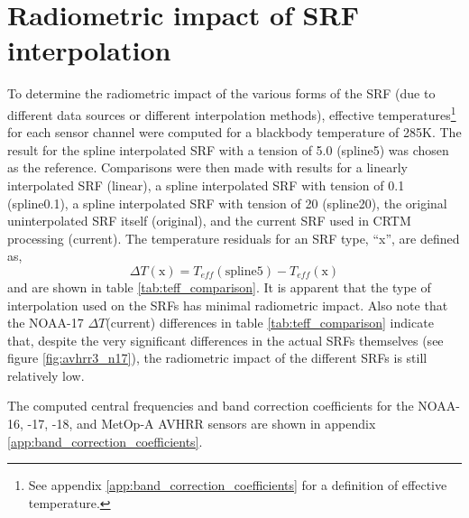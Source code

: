 \section{Radiometric impact of SRF interpolation}
To determine the radiometric impact of the various forms of the SRF (due to different data sources or different interpolation methods), effective temperatures\footnote{See appendix \ref{app:band_correction_coefficients} for a definition of effective temperature.} for each sensor channel were computed for a blackbody temperature of 285K. The result for the spline interpolated SRF with a tension of 5.0 (spline5) was chosen as the reference. Comparisons were then made with results for a linearly interpolated SRF (linear), a spline interpolated SRF with tension of 0.1 (spline0.1), a spline interpolated SRF with tension of 20 (spline20), the original uninterpolated SRF itself (original), and the current SRF used in CRTM processing (current). The temperature residuals for an SRF type, ``x'', are defined as,
\begin{equation}
  \Delta T(\textrm{x}) = T_{eff}(\textrm{spline5}) - T_{eff}(\textrm{x})
\end{equation}
and are shown in table \ref{tab:teff_comparison}. It is apparent that the type of interpolation used on the SRFs has minimal radiometric impact. Also note that the NOAA-17 $\Delta T$(current) differences in table \ref{tab:teff_comparison} indicate that, despite the very significant differences in the actual SRFs themselves (see figure \ref{fig:avhrr3_n17}), the radiometric impact of the different SRFs is still relatively low.

The computed central frequencies and band correction coefficients for the NOAA-16, -17, -18, and MetOp-A AVHRR sensors are shown in appendix \ref{app:band_correction_coefficients}.

